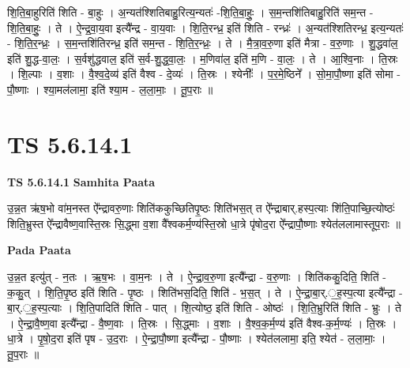 \documentclass[17pt]{extarticle}
\begin{document}
शि॒ति॒बा॒हुरिति॑ शिति - बा॒हुः । अ॒न्यत॑श्शितिबाहु॒रित्य॒न्यतः॑ -शि॒ति॒बा॒हुः॒ । स॒म॒न्तशि॑तिबाहु॒रिति॑ सम॒न्त - शि॒ति॒बा॒हुः॒ । ते । ऐ॒न्द्र॒वा॒य॒वा इत्यै᳚न्द्र - वा॒य॒वाः । शि॒ति॒रन्ध्र॒ इति॑ शिति - रन्ध्रः॑ । अ॒न्यत॑श्शितिरन्ध्र॒ इत्य॒न्यतः॑ - शि॒ति॒र॒न्ध्रः॒ । स॒म॒न्तशि॑तिरन्ध्र॒ इति॑ सम॒न्त - शि॒ति॒र॒न्ध्रः॒ । ते । मै॒त्रा॒व॒रु॒णा इति॑ मैत्रा - व॒रु॒णाः । शु॒द्धवा॑ल॒ इति॑ शु॒द्ध-वा॒लः॒ । स॒र्वशु॑द्धवाल॒ इति॑ स॒र्व-शु॒द्ध॒वा॒लः॒ । म॒णिवा॑ल॒ इति॑ म॒णि - वा॒लः॒ । ते । आ॒श्वि॒नाः । ति॒स्रः । शि॒ल्पाः । व॒शाः । वै॒श्व॒दे॒व्य॑ इति॑ वैश्व - दे॒व्यः॑ । ति॒स्रः । श्येनीः᳚ । प॒र॒मे॒ष्ठिने᳚ । सो॒मा॒पौ॒ष्णा इति॑ सोमा - पौ॒ष्णाः । श्या॒मल॑लामा॒ इति॑ श्या॒म - ल॒ला॒माः॒ । तू॒प॒राः ॥  \newline




\section*{ TS 5.6.14.1 }

\textbf{TS 5.6.14.1 } \newline
\textbf{Samhita Paata} \newline

उ॒न्न॒त ऋ॑ष॒भो वा॑म॒नस्त ऐ᳚न्द्रावरु॒णाः शिति॑ककुच्छितिपृ॒ष्ठः शिति॑भस॒त् त ऐ᳚न्द्राबार्.हस्प॒त्याः शि॑ति॒पाच्छि॒त्योष्ठः॑ शिति॒भ्रुस्त ऐ᳚न्द्रावैष्ण॒वास्ति॒स्रः सि॒द्ध्मा व॒शा वै᳚श्वकर्म॒ण्य॑स्ति॒स्रो धा॒त्रे पृ॑षोद॒रा ऐ᳚न्द्रापौ॒ष्णाः श्येत॑ललामास्तूप॒राः ॥ \newline

\textbf{Pada Paata} \newline

उ॒न्न॒त इत्यु॑त् - न॒तः । ऋ॒ष॒भः । वा॒म॒नः । ते । ऐ॒न्द्रा॒व॒रु॒णा इत्यै᳚न्द्रा - व॒रु॒णाः । शिति॑ककु॒दिति॒ शिति॑ - क॒कु॒त् । शि॒ति॒पृ॒ष्ठ इति॑ शिति - पृ॒ष्ठः । शिति॑भस॒दिति॒ शिति॑ - भ॒स॒त् । ते । ऐ॒न्द्रा॒बा॒र्.॒ह॒स्प॒त्या इत्यै᳚न्द्रा - बा॒र्.॒ह॒स्प॒त्याः । शि॒ति॒पादिति॑ शिति - पात् । शि॒त्योष्ठ॒ इति॑ शिति - ओष्ठः॑ । शि॒ति॒भ्रुरिति॑ शिति - भ्रुः । ते । ऐ॒न्द्रा॒वै॒ष्ण॒वा इत्यै᳚न्द्रा - वै॒ष्ण॒वाः । ति॒स्रः । सि॒द्ध्माः । व॒शाः । वै॒श्व॒क॒र्म॒ण्य॑ इति॑ वैश्व-क॒र्म॒ण्यः॑ । ति॒स्रः । धा॒त्रे । पृ॒षो॒द॒रा इति॑ पृष - उ॒द॒राः । ऐ॒न्द्रा॒पौ॒ष्णा इत्यै᳚न्द्रा - पौ॒ष्णाः । श्येत॑ललामा॒ इति॒ श्येत॑ - ल॒ला॒माः॒ । तू॒प॒राः ॥  \newline




\end{document}
